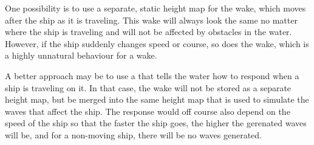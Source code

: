 One possibility is to use a separate, static height map for the wake, which moves after the ship as it is traveling. This wake will always look the same no matter where the ship is traveling and will not be affected by obstacles in the water. However, if the ship suddenly changes speed or course, so does the wake, which is a highly unnatural behaviour for a wake.

A better approach may be to use a  that tells the water how to respond when a ship is traveling on it. In that case, the wake will not be stored as a separate height map, but be merged into the same height map that is used to simulate the waves that affect the ship. The response would off course also depend on the speed of the ship so that the faster the ship goes, the higher the gerenated waves will be, and for a non-moving ship, there will be no waves generated.